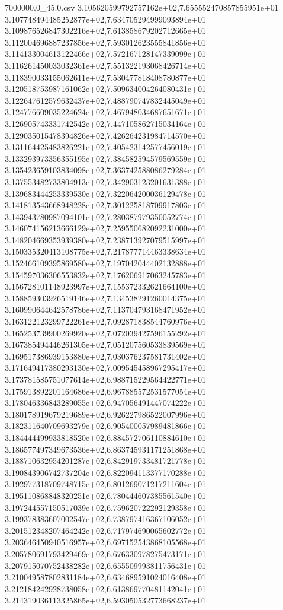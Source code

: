 \begin{filecontents*}{7000000.0_45.0.csv}
3.105620599792757162e+02,7.655552470857855951e+01
3.107748494485252877e+02,7.634705294999093894e+01
3.109876526847302216e+02,7.613858679202712665e+01
3.112004696887237856e+02,7.593012623555841856e+01
3.114133004613122466e+02,7.572167128147339099e+01
3.116261450033032361e+02,7.551322193068426714e+01
3.118390033155062611e+02,7.530477818408780877e+01
3.120518753987161062e+02,7.509634004264080431e+01
3.122647612579632437e+02,7.488790747832445049e+01
3.124776609035224624e+02,7.467948034687651671e+01
3.126905743331742542e+02,7.447105862715034164e+01
3.129035015478394826e+02,7.426264231984714570e+01
3.131164425483826221e+02,7.405423142577456019e+01
3.133293973356355195e+02,7.384582594579569559e+01
3.135423659103834098e+02,7.363742588086279284e+01
3.137553482733804913e+02,7.342903123201631388e+01
3.139683444253339530e+02,7.322064200036129478e+01
3.141813543668948228e+02,7.301225818709917803e+01
3.143943780987094101e+02,7.280387979350052774e+01
3.146074156213666129e+02,7.259550682092231000e+01
3.148204669353939380e+02,7.238713927079515997e+01
3.150335320413108775e+02,7.217877714463338634e+01
3.152466109395869580e+02,7.197042044402132888e+01
3.154597036306553832e+02,7.176206917063245783e+01
3.156728101148923997e+02,7.155372332621664100e+01
3.158859303926519146e+02,7.134538291260014375e+01
3.160990644642578786e+02,7.113704793168471952e+01
3.163122123299722261e+02,7.092871838544760976e+01
3.165253739900269920e+02,7.072039427596155292e+01
3.167385494446261305e+02,7.051207560533839569e+01
3.169517386939153880e+02,7.030376237581731402e+01
3.171649417380293130e+02,7.009545458967295417e+01
3.173781585751077614e+02,6.988715229564422771e+01
3.175913892201164686e+02,6.967885572531577054e+01
3.178046336843289055e+02,6.947056491447074222e+01
3.180178919679219689e+02,6.926227986522007996e+01
3.182311640709693279e+02,6.905400057989481866e+01
3.184444499933818520e+02,6.884572706110884610e+01
3.186577497349673536e+02,6.863745931171251868e+01
3.188710632954201287e+02,6.842919733481721778e+01
3.190843906742737204e+02,6.822094113377170288e+01
3.192977318709748715e+02,6.801269071217211604e+01
3.195110868848320251e+02,6.780444607385561540e+01
3.197244557150517039e+02,6.759620722292129358e+01
3.199378383607002547e+02,6.738797416367106052e+01
3.201512348207464242e+02,6.717974690065602772e+01
3.203646450940516957e+02,6.697152543868105568e+01
3.205780691793429469e+02,6.676330978275473171e+01
3.207915070752438282e+02,6.655509993811756431e+01
3.210049587802831184e+02,6.634689591024016408e+01
3.212184242928738058e+02,6.613869770481142041e+01
3.214319036113325865e+02,6.593050532773668237e+01

\end{filecontents*}
